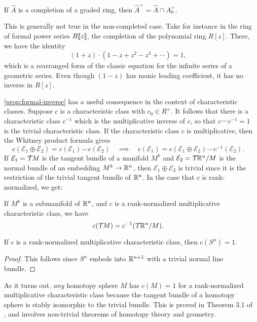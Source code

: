 \begin{proposition}\label{prop:formal-inverse}
	If $\widehat{A}$ is a completion of a graded ring, then $\widehat{A}^\times = \widehat{A} \cap A_0^\times$.
\end{proposition}

\begin{remark}
	This is generally not true in the non-completed case. Take for instance in the ring of formal power series $R[\![z]\!]$, the completion of the polynomial ring $R[z]$. There, we have the identity
	\[
		(1+z)\cdot (1-z+z^2-z^3+\cdots) = 1,
	\]
	which is a rearranged form of the classic equation for the infinite series of a geometric series. Even though $(1-z)$ has monic leading coefficient, it has no inverse in $R[z]$.
\end{remark}

\cref{prop:formal-inverse} has a useful consequence in the context of characteristic classes. Suppose $c$ is a characteristic class with $c_0\in R^\times$. It follows that there is a characteristic class $c^{-1}$ which is the multiplicative inverse of $c$, so that $c\smile c^{-1}=1$ is the trivial characteristic class. If the characteristic class $c$ is multiplicative, then the Whitney product formula gives
\[
	c(\mathcal{E}_1\oplus\mathcal{E}_2)	 = c(\mathcal{E}_1)\smile c(\mathcal{E}_2)
	\quad\implies\quad
	c(\mathcal{E}_1) = c(\mathcal{E}_1\oplus \mathcal{E}_2) \smile c^{-1}(\mathcal{E}_2).
\]
If $\mathcal{E}_1={\mathcal{T}\hspace{-0.1em}} M$ is the tangent bundle of a manifold $M^k$ and $\mathcal{E}_2={\mathcal{T}\hspace{-0.1em}}\mathbb{R}^{n}/M$ is the normal bundle of an embedding $M^k\to \mathbb{R}^{n}$, then $\mathcal{E}_1\oplus \mathcal{E}_2$ is trivial since it is the restriction of the trivial tangent bundle of $\mathbb{R}^n$. In the case that $c$ is rank-normalized, we get:
\begin{theorem}\label{thm:whitney-duality}
	If $M^k$ is a submanifold of $\mathbb{R}^n$, and $c$ is a rank-normalized multiplicative characteristic class, we have
	\[
		c({\mathcal{T}\hspace{-0.1em}} M) = c^{-1}({\mathcal{T}\hspace{-0.1em}} \mathbb{R}^n/M).
	\]
\end{theorem}

\begin{corollary}
	If $c$ is a rank-normalized multiplicative characteristic class, then $c(S^n)=1$.
\end{corollary}
\begin{proof}
	This follows since $S^n$ embeds into $\mathbb{R}^{n+1}$ with a trivial normal line bundle.
\end{proof}

\begin{remark}
	As it turns out, \emph{any} homotopy sphere $M$ has $c(M)=1$ for a rank-normalized multiplicative characteristic class because the tangent bundle of a homotopy sphere is stably isomorphic to the trivial bundle. This is proved in Theorem 3.1 of \cite{milnorkervaire1963groups}, and involves non-trivial theorems of homotopy theory and geometry.
\end{remark}

